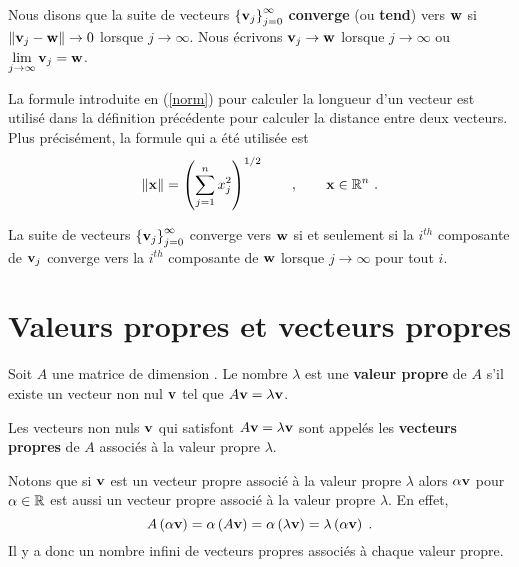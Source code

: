 {\begin{focus}{\dfn} 
Nous disons que la suite de vecteurs
$\displaystyle \left\{\mathbf{v}_j\right\}_{j=0}^\infty$
{\bfseries converge} (ou {\bfseries tend}) vers $\mathbf{w}$ si
$\| \mathbf{v}_j - \mathbf{w}\|\to 0$ lorsque $j \to \infty$.  Nous écrivons
$\mathbf{v}_j \rightarrow \mathbf{w}$ lorsque $j\rightarrow \infty$ ou
$\displaystyle \lim_{j\to \infty} \mathbf{v}_j = \mathbf{w}$.
\end{focus}

La formule introduite en (\ref{norm}) pour calculer la longueur d'un
vecteur est utilisé dans la définition précédente pour calculer la
distance entre deux vecteurs.   Plus précisément, la formule qui a été
utilisée est
\[
\| \mathbf{x} \| = \left( \sum_{j=1}^n x_j^2 \right)^{1/2} \qquad , \qquad
\mathbf{x} \in \mathbb{R}^n \ .
\]

\begin{focus}{\prp}
La suite de vecteurs $\displaystyle \left\{\mathbf{v}_j\right\}_{j=0}^\infty$
converge vers $\mathbf{w}$ si et seulement si la $i^{th}$ composante de
$\mathbf{v}_j$ converge vers la $i^{th}$ composante de $\mathbf{w}$ lorsque
$j\rightarrow \infty$ pour tout $i$.
\end{focus}

\section{Valeurs propres et vecteurs propres}

\begin{focus}{\dfn} 
Soit $A$ une matrice de dimension \nn.  Le nombre $\lambda$ est une
{\bfseries valeur propre} de $A$ s'il existe un
vecteur non nul $\mathbf{v}$ tel que $A\mathbf{v} = \lambda \mathbf{v}$.

Les vecteurs non nuls $\mathbf{v}$ qui satisfont
$A\mathbf{v} = \lambda \mathbf{v}$ sont appelés les
{\bfseries vecteurs propres} de $A$ associés à
la valeur propre $\lambda$.
\end{focus}

Notons que si $\mathbf{v}$ est un vecteur propre associé à la valeur
propre $\lambda$ alors $\alpha \mathbf{v}$ pour $\alpha \in \mathbb{R}$ est
aussi un vecteur propre associé à la valeur propre $\lambda$.  En
effet,
\[
A\left(\alpha \mathbf{v}\right) = \alpha \left(A\mathbf{v}\right)
= \alpha \left( \lambda \mathbf{v} \right)
= \lambda \left(\alpha \mathbf{v}\right) \; .
\]
Il y a donc un nombre infini de vecteurs propres associés à chaque
valeur propre.

}
